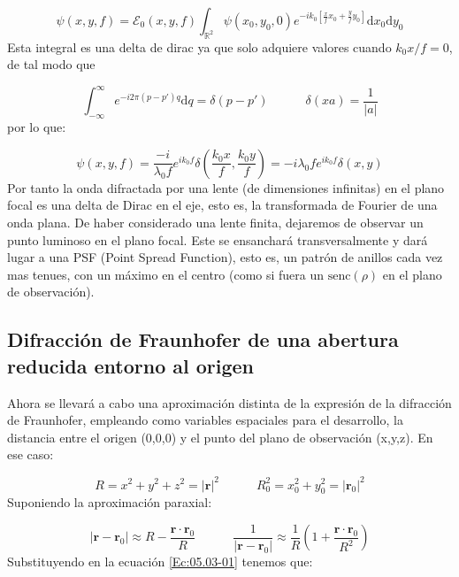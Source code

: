 \documentclass[12pt,a4paper]{book}
\numberwithin{equation}{section}
\numberwithin{figure}{section}
\newcommand{\tquad}{\quad \quad \quad}
\newcommand{\parentesis}[1]{\left( #1  \right)}
\newcommand{\ccorchetes}[1]{\left[ #1  \right]}
\newcommand{\D}{\mathrm{d}}
\newcommand{\1}{_{(1)}}
\newcommand{\2}{_{(2)}}
\newcommand{\sinc}{\mathrm{senc} }
\newcommand{\intinf}{\int_{-\infty}^{\infty}}
\newcommand{\rn}{\mathbf{r}}
\theoremstyle{definition}
\begin{document}
\begin{equation}
    \psi (x,y,f) = \mathcal{E}_0 (x,y,f) \int_{\mathbb{R}^2} \psi (x_0,y_0,0) e^{-i k_0 \ccorchetes{\frac{x}{f}x_0+\frac{y}{f}y_0}} \D x_0 \D y_0
\end{equation}
Esta integral es una delta de dirac ya que solo adquiere valores cuando $k_0x/f=0$, de tal modo que

\begin{equation}
    \intinf e^{- i 2 \pi (p-p')q} \D q = \delta (p-p') \tquad \delta (xa) = \frac{1}{|a|} 
\end{equation}
por lo que:

\begin{equation}
    \psi (x,y,f) = \frac{-i}{\lambda_0f} e^{ik_0f}\delta \parentesis{\frac{k_0x}{f},\frac{k_0y}{f}} = - i \lambda_0 f e^{ik_0f} \delta(x,y)
\end{equation}
Por tanto la onda difractada por una lente (de dimensiones infinitas) en el plano focal es una delta de Dirac en el eje, esto es, la transformada de Fourier de una onda plana. De haber considerado una lente finita, dejaremos de observar un punto luminoso en el plano focal. Este se ensanchará transversalmente y dará lugar a una PSF (Point Spread Function), esto es, un patrón de anillos cada vez mas tenues, con un máximo en el centro (como si fuera un $\sinc (\rho)$ en el plano de observación).

\subsection{Difracción de Fraunhofer de una abertura reducida entorno al origen}

Ahora se llevará a cabo una aproximación distinta de la expresión de la difracción de Fraunhofer, empleando como variables espaciales para el desarrollo, la distancia entre el origen (0,0,0) y el punto del plano de observación (x,y,z). En ese caso:

\begin{equation}
    R = x^2 + y^2 + z^2 = |\rn|^2 \tquad R_0^2 = x_0^2 + y_0^2 = |\rn_0|^2
\end{equation}
Suponiendo la aproximación paraxial:

\begin{equation}
    |\rn-\rn_0|\approx R - \frac{\rn \cdot \rn_0}{R} \tquad \frac{1}{|\rn-\rn_0|} \approx \frac{1}{R} \parentesis{1+\frac{\rn \cdot \rn_0}{R^2}}
\end{equation} 
Substituyendo en la ecuación \ref{Ec:05.03-01} tenemos que:
\end{document}
